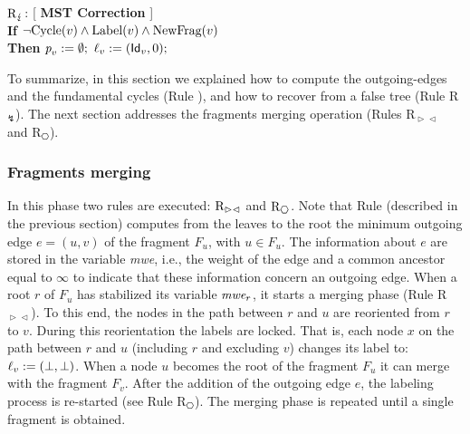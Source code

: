 \documentclass[11pt,a4paper]{article}
\newcommand{\id}{\mbox{\sf Id}}
\newcommand{\parent}{\mbox{\it p}}
\newcommand{\lab}{\mbox{\rm $\ell$}}
\newcommand{\m}{\mbox{\it mwe}}
\newcommand{\Cycle}{\mbox{\rm Cycle}}
\newcommand{\Label}{\mbox{\rm Label}}
\newcommand{\NewFragment}{\mbox{\rm NewFrag}}
\newcommand{\RC}{\mbox{\rm R$_{\lightning}$}} \newcommand{\RReo}{\mbox{\rm R$_{\downarrow}$}}
\newcommand{\RF}{\mbox{\rm R$_{\vartriangleright \vartriangleleft}$}}
\newcommand{\REnd}{\mbox{\rm R$_{\hexagon}$}}
\begin{document}
\begin{description}
\item $\RC$: [ \textbf{MST Correction} ] \\
\textbf{If} $\neg \Cycle(v) \wedge \Label(v) \wedge \NewFragment(v)$\\
\textbf{Then } $\parent_v:=\emptyset;\ \lab_v:=(\id_v,0);$
\end{description}

To summarize, in this section we explained how to compute the outgoing-edges and the
fundamental cycles (Rule \RMin\/),  and how to recover from a false tree
(Rule \RC\/). The next section addresses the fragments merging operation (Rules \RF\/ and \REnd).

\subsubsection{Fragments merging}

In this phase two rules are executed: $\RF$ and $\REnd$. 
Note that Rule \RMin\/ (described in the previous section) computes
from the leaves to the root 
the minimum outgoing edge $e=(u,v)$ of the fragment $F_u$, with $u\in F_u$.
The information about $e$ are stored in the variable \m\/, i.e., the weight of the edge and a common ancestor equal to $\infty$ to indicate that these information concern an outgoing edge.  
When a root $r$ of $F_u$ has stabilized its variable $\m_r$, it starts a merging phase (Rule \RF\/).
To this end, the nodes in the path between $r$ and $u$ are reoriented from $r$ to $v$.
During this reorientation the labels are locked. That is, each node $x$ on the path between $r$ and $u$ (including $r$ and excluding $v$) changes its label to: $\lab_v:=(\bot,\bot)$.
When a node $u$ becomes the root of the fragment $F_u$ it can merge
with the fragment $F_v$.
After the addition of the outgoing edge $e$, the labeling process is re-started (see Rule \REnd).
The merging phase is repeated until a single fragment is obtained.


 
\end{document}
